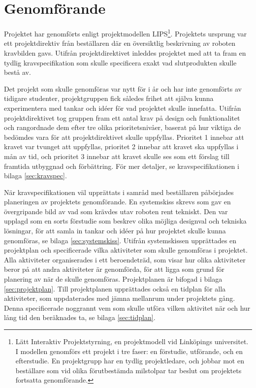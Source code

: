 

\section{Genomförande}
\label{sec:utforande}
Projektet har genomförts enligt projektmodellen LIPS\footnote{Lätt Interaktiv Projektstyrning, en projektmodell vid Linköpings universitet. I modellen genomförs ett projekt i tre faser: en förstudie, utförande, och en efterstudie. En projektgrupp har en tydlig projektledare, och jobbar mot en beställare som vid olika förutbestämda milstolpar tar beslut om projektets fortsatta genomförande.}. Projektets ursprung var ett projektdirektiv från beställaren där en översiktlig beskrivning av roboten  kravbilden gavs. Utifrån projektdirektivet inleddes projektet med att ta fram en tydlig kravspecifikation som skulle specificera exakt vad slutprodukten skulle bestå av.

Det projekt som skulle genomföras var nytt för i år och har inte genomförts av tidigare studenter, projektgruppen fick således frihet att själva kunna experimentera med tankar och idéer för vad projektet skulle innefatta. Utifrån projektdirektivet tog gruppen fram ett antal krav på design och funktionalitet och rangordnade dem efter tre olika prioritetsnivåer, baserat på hur viktiga de bedömdes vara för att projektdirektivet skulle uppfyllas. Prioritet 1 innebar att kravet var tvunget att uppfyllas, prioritet 2 innebar att kravet ska uppfyllas i mån av tid, och prioritet 3 innebar att kravet skulle ses som ett förslag till framtida utbyggnad och förbättring. För mer detaljer, se kravspecifikationen i bilaga \ref{sec:kravspec}.

När kravspecifikationen väl upprättats i samråd med beställaren påbörjades planeringen av projektets genomförande. En systemskiss skrevs som gav en övergripande bild av vad som krävdes utav roboten rent tekniskt. Den var upplagd som en sorts förstudie som beskrev olika möjliga designval och tekniska lösningar, för att samla in tankar och idéer på hur projektet skulle kunna genomföras, se bilaga \ref{sec:systemskiss}. Utifrån systemskissen upprättades en projektplan och specificerade vilka aktiviteter som skulle genomföras i projektet. Alla aktiviteter organiserades i ett beroendeträd, som visar hur olika aktiviteter beror på att andra aktiviteter är genomförda, för att ligga som grund för planering av när de skulle genomföras. Projektplanen är bifogad i bilaga \ref{sec:projektplan}. Till projektplanen upprättades också en tidplan för alla aktiviteter, som uppdaterades med jämna mellanrum under projektets gång. Denna specificerade noggrannt vem som skulle utföra vilken aktivitet när och hur lång tid den beräknades ta, se bilaga \ref{sec:tidplan}.

